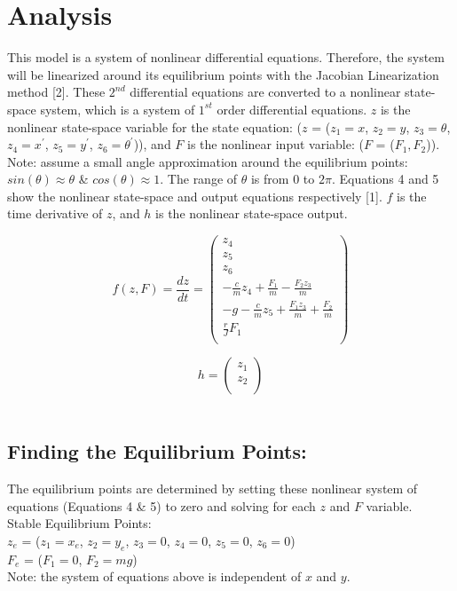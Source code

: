 \documentclass[conference]{IEEEtran}
\begin{document}
\newpage
\section{Analysis}
This model is a system of nonlinear differential equations. Therefore, the system will be linearized around its equilibrium points with the Jacobian Linearization method [2]. These $2^{nd}$ differential equations are converted to a nonlinear state-space system, which is a system of $1^{st}$  order differential equations. $z$ is the nonlinear state-space variable for the state equation: ($z$ = ($z_1 = x$, $z_2 = y$, $z_3 = \theta$, $z_4 = x^\prime$, $z_5 = y^\prime$, $z_6 = \theta^\prime$)), and $F$ is the nonlinear input variable: ($F$ = ($F_1, F_2$)).\\

Note: assume a small angle approximation around the equilibrium points: $sin(\theta) \approx \theta$ \& $cos(\theta) \approx 1$. The range of $\theta$ is from 0 to $2\pi$. Equations 4 and 5 show the nonlinear state-space and output equations respectively [1]. $f$ is the time derivative of $z$, and $h$ is the nonlinear state-space output.

\[
f(z,F) = \frac{dz}{dt} =
\begin{pmatrix}
z_4\\
z_5\\
z_6 \\
-\frac{c}{m}z_4 + \frac{F_1}{m} -\frac{F_2z_3}{m}\\
-g - \frac{c}{m}z_5 + \frac{F_1z_3}{m} +\frac{F_2}{m}\\
\frac{r}{J}F_1\\
\end{pmatrix}  
\tag{4}
\]

\[
h = 
\begin{pmatrix}
z_1\\
z_2\\
\end{pmatrix}
\tag{5}
\]\\

\subsection{Finding the Equilibrium Points:}
The equilibrium points are determined by setting these nonlinear system of equations (Equations 4 \& 5) to zero and solving for each $z$ and $F$ variable. \\

\noindent Stable Equilibrium Points: \\
\indent $z_e$ = ($z_1 = x_e$, $z_2 = y_e$, $z_3 = 0$, $z_4 = 0$, $z_5 = 0$, $z_6 = 0$)\\
\indent $F_e$ = ($F_1 = 0$, $F_2 = mg$)\\
Note: the system of equations above is independent of $x$ and $y$. \\
\end{document}
